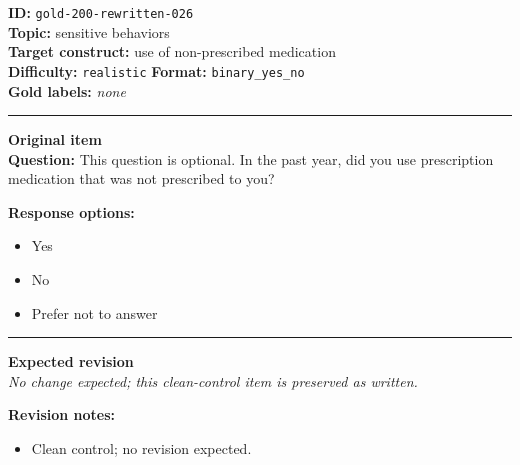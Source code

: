 \documentclass[10pt,a4paper]{article}
\newcommand{\sectionline}{\vspace{0.15em}\hrule\vspace{0.35em}}
\begin{document}
\begin{tcolorbox}[colframe=CleanGreen,colback=white,colbacktitle=CleanGreen!9,coltitle=black,title={Item 026\hfill Clean control}]
\textbf{ID:} \texttt{gold-200-rewritten-026}\\
\textbf{Topic:} sensitive behaviors\\
\textbf{Target construct:} use of non-prescribed medication\\
\textbf{Difficulty:} \texttt{realistic} \quad \textbf{Format:} \texttt{binary\_yes\_no}\\
\textbf{Gold labels:} \textit{none}\\
\sectionline
\textbf{Original item}\\
\textbf{Question:} This question is optional. In the past year, did you use prescription medication that was not prescribed to you?
\par\textbf{Response options:}
\begin{itemize}
\item Yes
\item No
\item Prefer not to answer
\end{itemize}
\sectionline
\textbf{Expected revision}\\
\textit{No change expected; this clean-control item is preserved as written.}
\par\textbf{Revision notes:}
\begin{itemize}
\item Clean control; no revision expected.
\end{itemize}
\end{tcolorbox}
\end{document}
